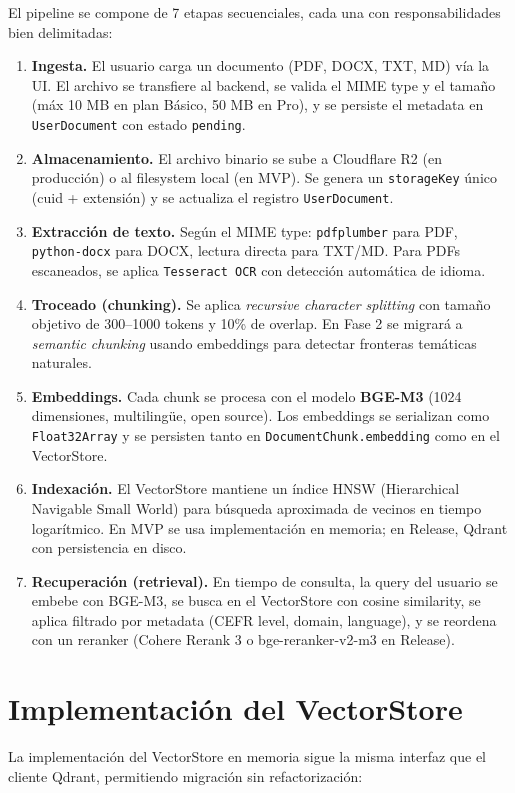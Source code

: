 \documentclass[10pt,a4paper,oneside]{report}
\begin{document}
El pipeline se compone de 7 etapas secuenciales, cada una con responsabilidades bien delimitadas:

\begin{enumerate}[leftmargin=1.6em]
\item \textbf{Ingesta.} El usuario carga un documento (PDF, DOCX, TXT, MD) vía la UI. El archivo se transfiere al backend, se valida el MIME type y el tamaño (máx 10 MB en plan Básico, 50 MB en Pro), y se persiste el metadata en \texttt{UserDocument} con estado \texttt{pending}.
\item \textbf{Almacenamiento.} El archivo binario se sube a Cloudflare R2 (en producción) o al filesystem local (en MVP). Se genera un \texttt{storageKey} único (cuid + extensión) y se actualiza el registro \texttt{UserDocument}.
\item \textbf{Extracción de texto.} Según el MIME type: \texttt{pdfplumber} para PDF, \texttt{python-docx} para DOCX, lectura directa para TXT/MD. Para PDFs escaneados, se aplica \texttt{Tesseract OCR} con detección automática de idioma.
\item \textbf{Troceado (chunking).} Se aplica \textit{recursive character splitting} con tamaño objetivo de 300--1000 tokens y 10\% de overlap. En Fase 2 se migrará a \textit{semantic chunking} usando embeddings para detectar fronteras temáticas naturales.
\item \textbf{Embeddings.} Cada chunk se procesa con el modelo \textbf{BGE-M3} (1024 dimensiones, multilingüe, open source). Los embeddings se serializan como \texttt{Float32Array} y se persisten tanto en \texttt{DocumentChunk.embedding} como en el VectorStore.
\item \textbf{Indexación.} El VectorStore mantiene un índice HNSW (Hierarchical Navigable Small World) para búsqueda aproximada de vecinos en tiempo logarítmico. En MVP se usa implementación en memoria; en Release, Qdrant con persistencia en disco.
\item \textbf{Recuperación (retrieval).} En tiempo de consulta, la query del usuario se embebe con BGE-M3, se busca en el VectorStore con cosine similarity, se aplica filtrado por metadata (CEFR level, domain, language), y se reordena con un reranker (Cohere Rerank 3 o bge-reranker-v2-m3 en Release).
\end{enumerate}

\section{Implementación del VectorStore}
La implementación del VectorStore en memoria sigue la misma interfaz que el cliente Qdrant, permitiendo migración sin refactorización:
\end{document}
